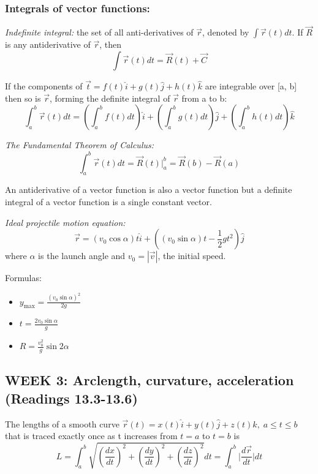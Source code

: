 \documentclass[12pt]{article}
\begin{document}
\subsubsection{Integrals of vector functions:}
\emph{Indefinite integral:} the set of all anti-derivatives of $\vec{r}$, denoted by $\int \vec{r}(t) dt$. If $\vec{R}$ is any antiderivative of $\vec{r}$, then
$$\int \vec{r}(t) dt = \vec{R}(t) + \vec{C}$$

If the components of $\vec{t} = f(t) \hat{i} + g(t)\hat{j} + h(t) \hat{k}$ are integrable over [a, b] then so is $\vec{r}$, forming the definite integral of $\vec{r}$ from a to b:
$$\int_a^b \vec{r}(t) dt = \left(\int_a^b f(t) dt\right) \hat{i} + \left(\int_a^b g(t) dt\right) \hat{j} +\left(\int_a^b h(t) dt\right) \hat{k}$$

\emph{The Fundamental Theorem of Calculus:}
$$\int_a^b \vec{r}(t) dt = \vec{R}(t) \Bigr|_a^b = \vec{R}(b) - \vec{R}(a)$$

An antiderivative of a vector function is also a vector function but a definite integral of a vector function is a single constant vector. 

\emph{Ideal projectile motion equation:}
$$\vec{r} = (v_0 \cos \alpha)t \hat{i} + \left((v_0 \sin \alpha)t - \frac{1}{2}gt^2\right) \hat{j}$$
where $\alpha$ is the launch angle and $v_0 = |\vec{v}|$, the initial speed.

Formulas:
\begin{itemize}
    \item $y_{\text{max}} =  \frac{(v_0 \sin \alpha)^2}{2g}$
    \item $t = \frac{2v_0 \sin \alpha}{g}$
    \item $R = \frac{v_0^2}{g}\sin 2\alpha$
\end{itemize}

\subsection{WEEK 3: Arclength, curvature, acceleration (Readings 13.3-13.6)}

The lengths of a smooth curve $\vec{r}(t) = x(t) \hat{i} + y(t) \hat{j} + z(t) \hat{k}, \; a \leq t\leq b$ that is traced exactly once as t increases from $t = a$ to $t=b$ is
$$L = \int_a^b \sqrt{\left(\frac{dx}{dt}\right)^2 + \left(\frac{dy}{dt}\right)^2 + \left(\frac{dz}{dt}\right)^2}dt = \int_a^b \biggl|\frac{d\vec{r}}{dt}\biggr| dt$$
\end{document}
